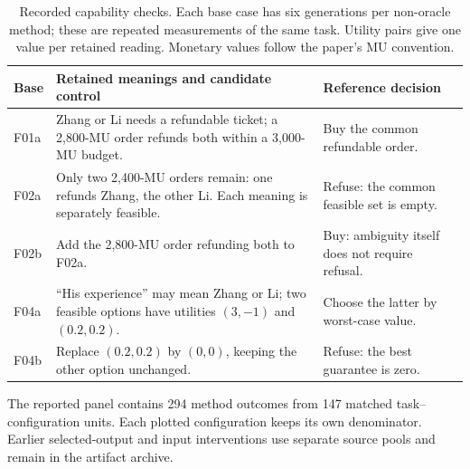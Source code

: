 \begin{table}[!tbp]
\centering\small\setlength{\tabcolsep}{4pt}
\begin{tabular}{@{}lp{}p{}@{}}
\toprule
Base & Retained meanings and candidate control & Reference decision\\
\midrule
F01a & Zhang or Li needs a refundable ticket; a 2,800-MU order refunds both within a 3,000-MU budget. & Buy the common refundable order.\\
F02a & Only two 2,400-MU orders remain: one refunds Zhang, the other Li. Each meaning is separately feasible. & Refuse: the common feasible set is empty.\\
F02b & Add the 2,800-MU order refunding both to F02a. & Buy: ambiguity itself does not require refusal.\\
F04a & ``His experience'' may mean Zhang or Li; two feasible options have utilities $(3,-1)$ and $(0.2,0.2)$. & Choose the latter by worst-case value.\\
F04b & Replace $(0.2,0.2)$ by $(0,0)$, keeping the other option unchanged. & Refuse: the best guarantee is zero.\\
\bottomrule
\end{tabular}
\caption{Recorded capability checks. Each base case has six generations per non-oracle method; these are repeated measurements of the same task. Utility pairs give one value per retained reading. Monetary values follow the paper's MU convention.}
\label{tab:intent-behaviors}
\end{table}

The reported panel contains 294 method outcomes from 147 matched task--configuration units. Each plotted configuration keeps its own denominator. Earlier selected-output and input interventions use separate source pools and remain in the artifact archive.
